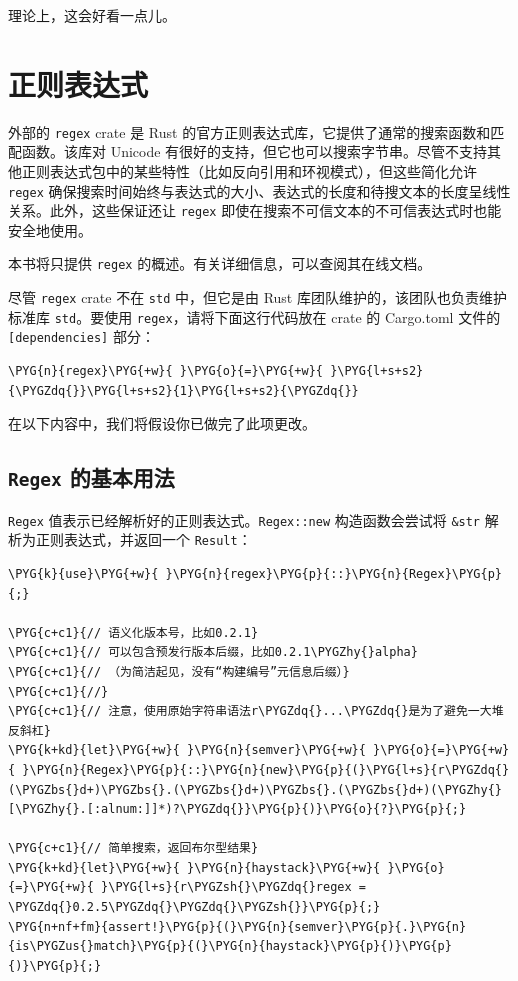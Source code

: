 理论上，这会好看一点儿。

\section{正则表达式}

外部的 \texttt{regex} crate 是 Rust 的官方正则表达式库，它提供了通常的搜索函数和匹配函数。该库对 Unicode 有很好的支持，但它也可以搜索字节串。尽管不支持其他正则表达式包中的某些特性（比如反向引用和环视模式），但这些简化允许 \texttt{regex} 确保搜索时间始终与表达式的大小、表达式的长度和待搜文本的长度呈线性关系。此外，这些保证还让 \texttt{regex} 即使在搜索不可信文本的不可信表达式时也能安全地使用。

本书将只提供 \texttt{regex} 的概述。有关详细信息，可以查阅其在线文档。

尽管 \texttt{regex} crate 不在 \texttt{std} 中，但它是由 Rust 库团队维护的，该团队也负责维护标准库 \texttt{std}。要使用 \texttt{regex}，请将下面这行代码放在 crate 的 Cargo.toml 文件的 \texttt{[dependencies]} 部分：

\begin{Verbatim}[commandchars=\\\{\},breaklines=true,breakanywhere=true,fontsize=\codefont,xleftmargin=17bp]
\PYG{n}{regex}\PYG{+w}{ }\PYG{o}{=}\PYG{+w}{ }\PYG{l+s+s2}{\PYGZdq{}}\PYG{l+s+s2}{1}\PYG{l+s+s2}{\PYGZdq{}}
\end{Verbatim}

在以下内容中，我们将假设你已做完了此项更改。

\subsection{\texttt{Regex} 的基本用法}

\texttt{Regex} 值表示已经解析好的正则表达式。\texttt{Regex::new} 构造函数会尝试将 \texttt{\&str} 解析为正则表达式，并返回一个 \texttt{Result}：

\begin{Verbatim}[commandchars=\\\{\},breaklines=true,breakanywhere=true,fontsize=\codefont,xleftmargin=17bp]
\PYG{k}{use}\PYG{+w}{ }\PYG{n}{regex}\PYG{p}{::}\PYG{n}{Regex}\PYG{p}{;}

\PYG{c+c1}{// 语义化版本号，比如0.2.1}
\PYG{c+c1}{// 可以包含预发行版本后缀，比如0.2.1\PYGZhy{}alpha}
\PYG{c+c1}{// （为简洁起见，没有“构建编号”元信息后缀）}
\PYG{c+c1}{//}
\PYG{c+c1}{// 注意，使用原始字符串语法r\PYGZdq{}...\PYGZdq{}是为了避免一大堆反斜杠}
\PYG{k+kd}{let}\PYG{+w}{ }\PYG{n}{semver}\PYG{+w}{ }\PYG{o}{=}\PYG{+w}{ }\PYG{n}{Regex}\PYG{p}{::}\PYG{n}{new}\PYG{p}{(}\PYG{l+s}{r\PYGZdq{}(\PYGZbs{}d+)\PYGZbs{}.(\PYGZbs{}d+)\PYGZbs{}.(\PYGZbs{}d+)(\PYGZhy{}[\PYGZhy{}.[:alnum:]]*)?\PYGZdq{}}\PYG{p}{)}\PYG{o}{?}\PYG{p}{;}

\PYG{c+c1}{// 简单搜索，返回布尔型结果}
\PYG{k+kd}{let}\PYG{+w}{ }\PYG{n}{haystack}\PYG{+w}{ }\PYG{o}{=}\PYG{+w}{ }\PYG{l+s}{r\PYGZsh{}\PYGZdq{}regex = \PYGZdq{}0.2.5\PYGZdq{}\PYGZdq{}\PYGZsh{}}\PYG{p}{;}
\PYG{n+nf+fm}{assert!}\PYG{p}{(}\PYG{n}{semver}\PYG{p}{.}\PYG{n}{is\PYGZus{}match}\PYG{p}{(}\PYG{n}{haystack}\PYG{p}{)}\PYG{p}{)}\PYG{p}{;}
\end{Verbatim}

